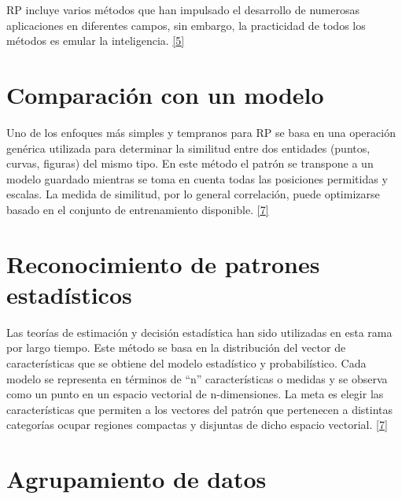 \documentclass[12pt,spanish,Letterpaper,openany]{book}
\newcommand{\spacetwomilis}{\vspace{2mm}}
\newcommand{\spaceonemilis}{\vspace{1mm}}
\begin{document}
\hypertarget{articulo12_cross05}{}
\hypertarget{articulo12_cross06}{}
\hypertarget{articulo12_cross07}{}

RP incluye varios métodos que han impulsado el desarrollo de numerosas aplicaciones en diferentes campos, sin embargo, la practicidad de todos los métodos es emular la inteligencia. \protect\hyperlink{articulo12_ref05}{{[}5{]}}

\hypertarget{comparaciuxf3n-con-un-modelo}{%
\section{Comparación con un modelo}\label{comparaciuxf3n-con-un-modelo}}

\spaceonemilis

Uno de los enfoques más simples y tempranos para RP se basa en una operación genérica utilizada para determinar la similitud entre dos entidades (puntos, curvas, figuras) del mismo tipo. En este método el patrón se transpone a un modelo guardado mientras se toma en cuenta todas las posiciones permitidas y escalas. La medida de similitud, por lo general correlación, puede optimizarse basado en el conjunto de entrenamiento disponible. \protect\hyperlink{articulo12_ref07}{{[}7{]}}

\spacetwomilis

\hypertarget{reconocimiento-de-patrones-estaduxedsticos}{%
\section{Reconocimiento de patrones estadísticos}\label{reconocimiento-de-patrones-estaduxedsticos}}

\spacetwomilis

Las teorías de estimación y decisión estadística han sido utilizadas en esta rama por largo tiempo. Este método se basa en la distribución del vector de características que se obtiene del modelo estadístico y probabilístico. Cada modelo se representa en términos de ``n'' características o medidas y se observa como un punto en un espacio vectorial de n-dimensiones. La meta es elegir las características que permiten a los vectores del patrón que pertenecen a distintas categorías ocupar regiones compactas y disjuntas de dicho espacio vectorial. \protect\hyperlink{articulo12_ref07}{{[}7{]}}

\spacetwomilis

\hypertarget{agrupamiento-de-datos}{%
\section{Agrupamiento de datos}\label{agrupamiento-de-datos}}
\end{document}
